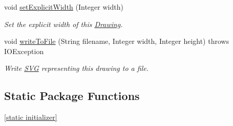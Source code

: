 \begin{DoxyCompactItemize}
void \hyperlink{classcom_1_1aarrelaakso_1_1drawl_1_1_drawing_a7bb5f35f3f77c0d5f319f5898aa203d8}{set\+Explicit\+Width} (Integer width)
\begin{DoxyCompactList}\small\item\em Set the explicit width of this \hyperlink{classcom_1_1aarrelaakso_1_1drawl_1_1_drawing}{Drawing}. \end{DoxyCompactList}\item 
void \hyperlink{classcom_1_1aarrelaakso_1_1drawl_1_1_drawing_aa7ecb028011f044cd8ce58f5b81a1e03}{write\+To\+File} (String filename, Integer width, Integer height)  throws I\+O\+Exception     
\begin{DoxyCompactList}\small\item\em Write \hyperlink{classcom_1_1aarrelaakso_1_1drawl_1_1_s_v_g}{S\+VG} representing this drawing to a file. \end{DoxyCompactList}\end{DoxyCompactItemize}
\subsection*{Static Package Functions}
\begin{DoxyCompactItemize}
\item 
\hyperlink{classcom_1_1aarrelaakso_1_1drawl_1_1_drawing_a40ce84a6d8110f7fb23a8faad42fb05f}{\mbox{[}static initializer\mbox{]}}
\end{DoxyCompactItemize}

